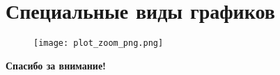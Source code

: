 \documentclass[xcolor=dvipsnames, 12pt]{beamer}
\begin{document}
\section{Специальные виды графиков }

\begin{frame}

\begin{center}
\begin{figure}[h!]
\hspace*{-1cm}
 \centering
 \texttt{[image: plot\_zoom\_png.png]}
\end{figure}
\end{center}

\end{frame}

\begin{frame}[standout]
  \textbf{Спасибо за внимание!}
\end{frame}
  
\end{document}
